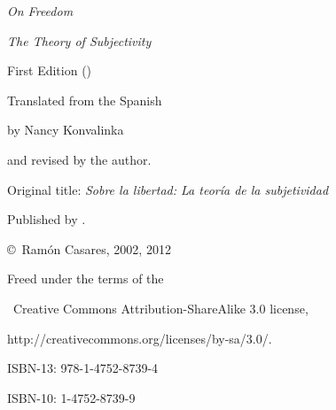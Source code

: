 \vfill
 {\sl On Freedom}\par
 {\sl The Theory of Subjectivity}\par
 First Edition (\todayiso)\par
 \null\par
 Translated from the Spanish\par
 by Nancy Konvalinka\par
 and revised by the author.\par
 Original title: {\sl Sobre la libertad: La teoría de la subjetividad}\par
 \null\par
 Published by .\par
 \copyright\ Ramón Casares, 2002, 2012\par
 Freed under the terms of the\par
 \ccbysa\ {\sf Creative Commons Attribution-ShareAlike 3.0} license,\par
     {http://creativecommons.org/licenses/by-sa/3.0/}.\par
 \null\par
 ISBN-13: 978-1-4752-8739-4\par
 ISBN-10: 1-4752-8739-9\par


\break %

\null
\vfil
{}
\vfil

\vfil
\break %

\null\vfil
\begingroup
\parindent=30pt \baselineskip=15pt

\def\tocleaders{\leaders\hbox to\baselineskip{\hss\bf.\hss}\hfil}

\def\tocline#1{\ifcase#1 \let\next=\toclinezero \or
 \let\next=\toclineone \or \let\next=\toclinetwo
 \else \let\next=\toclineindex \fi \next}

\def\toclinezero#1#2#3#4{\indent{\fonttwo Brief Contents}\par\kern8pt}
\def\toclineone#1#2#3#4{\indent#1\quad \goto{#4}{#2}\par}
\def\toclinetwo#1#2#3#4{\ignorespaces}
\def\References{References}
\def\toclineindex#1#2#3#4{\def\1{#1}\ifx\1\References\vskip8pt\fi
 \indent#1\quad \goto{#4}{#2}\par}



\endgroup

\kern2pc
\break

\endinput


